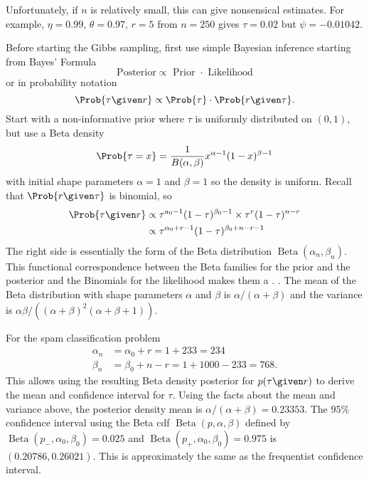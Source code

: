 \documentclass[12pt]{article}
\begin{document}
Unfortunately, if \( n \) is relatively small, this can give nonsensical
estimates.  For example, \( \eta = 0.99 \), \( \theta = 0.97 \), \( r =
5 \) from \( n = 250 \) gives \( \tau = 0.02 \) but \( \psi = -0.01042 \).

Before starting the Gibbs sampling, first use simple
Bayesian inference%
starting from Bayes' Formula%
\[
    \text{ Posterior} \propto \text{ Prior } \cdot \text{ Likelihood }
\] or in probability notation
\[
    \Prob{\tau \given r} \propto \Prob{\tau} \cdot \Prob{r \given \tau}.
\] Start with a non-informative prior where \( \tau \) is uniformly
distributed on \( (0,1) \), but use a Beta density
\[
    \Prob{\tau = x} = \frac{1}{B(\alpha, \beta)} x^{\alpha-1}(1-x)^{\beta-1}
\] with initial shape parameters \( \alpha = 1 \) and \( \beta = 1 \) so
the density is uniform.  Recall that \( \Prob{r \given \tau} \) is
binomial, so
\begin{align*}
    \Prob{\tau \given r} &\propto \tau^{a_0 - 1}(1-\tau)^{\beta_0 - 1}
    \times \tau^r (1 - \tau)^{n-r} \\
    &\propto \tau^{\alpha_0 + r -1} (1-\tau)^{\beta_0 + n - r -1} \\
\end{align*}
The right side is essentially the form of the Beta distribution \(
\operatorname{Beta}
(\alpha_n, \beta_n) \).  This functional correspondence between the Beta
families for the prior and the posterior and the Binomials for the
likelihood makes them a .%
%
.  The mean of the Beta distribution with shape parameters \( \alpha \)
and \( \beta \) is \( \alpha/(\alpha + \beta) \) and the variance is \(
\alpha \beta/((\alpha + \beta)^2(\alpha + \beta + 1)) \).

For the spam classification problem
\begin{align*}
    \alpha_n &= \alpha_0 + r = 1 + 233 = 234 \\
    \beta_n &= \beta_0 + n -r = 1 + 1000 - 233 = 768.
\end{align*}
This allows using the resulting Beta density posterior for \( p(\tau
\given r) \) to derive the mean and confidence interval for \( \tau \).
Using the facts about the mean and variance above, the posterior density
mean is \( \alpha/(\alpha + \beta) = 0.23353 \).  The \( 95\% \)
confidence interval using the Beta cdf \(
\operatorname{Beta}
(p, \alpha, \beta) \) defined by \(
\operatorname{Beta}
(p_{-}, \alpha_0, \beta_0) = 0.025 \) and \(
\operatorname{Beta}
(p_{+}, \alpha_0, \beta_0) = 0.975 \) is \( (0.20786, 0.26021) \).  This
is approximately the same as the frequentist confidence interval.
\end{document}
